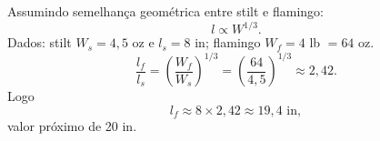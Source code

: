 Assumindo semelhança geométrica entre stilt e flamingo:
\[
l \propto W^{1/3}.
\]
Dados: stilt $W_s=4{,}5$ oz e $l_s=8$ in; flamingo $W_f=4$ lb $=64$ oz.
\[
\frac{l_f}{l_s}=\left(\frac{W_f}{W_s}\right)^{1/3}=\left(\frac{64}{4{,}5}\right)^{1/3}\approx 2{,}42.
\]
Logo
\[
l_f\approx 8\times 2{,}42\approx 19{,}4\text{ in},
\]
valor próximo de 20 in.

